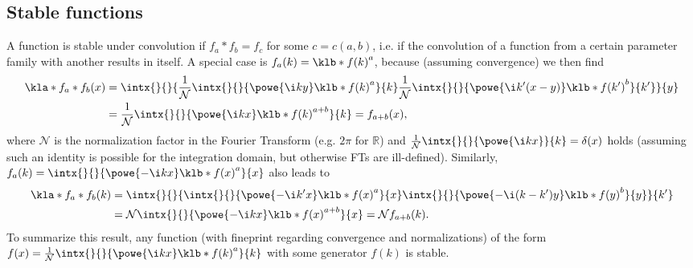 \documentclass[english, parskip=full]{scrartcl}
\begin{document}
\subsection{Stable functions}
A function is stable under convolution if $f_a \ast f_b = f_c$ for some $c=c(a,b)$, i.e. if the convolution of a function from a certain parameter family with another results in itself.
A special case is $f_a(k)=\klb*{f(k)}^a$, because (assuming convergence) we then find
\begin{align}
\kla*{f_a\ast f_b}(x) &= \intx{ }{ }{ \frac{1}{\mathcal{N}}\intx{ }{ }{\powe{\i ky} \klb*{f(k)}^a}{k} \frac{1}{\mathcal{N}}\intx{ }{ }{\powe{\i k'(x-y)} \klb*{f(k')}^b}{k'} }{y}\\
&= \frac{1}{\mathcal{N}} \intx{ }{ }{\powe{\i kx} \klb*{f(k)}^{a+b}}{k} = f_{a+b}(x) ,
\end{align}
where $\mathcal{N}$ is the normalization factor in the Fourier Transform (e.g. $2\pi$ for $\mathbb{R}$) and $\frac{1}{\mathcal{N}} \intx{ }{ }{\powe{\i kx}}{k} = \delta(x)$ holds (assuming such an identity is possible for the integration domain, but otherwise FTs are ill-defined).
Similarly, $f_a(k) = \intx{ }{ }{\powe{-\i kx} \klb*{f(x)}^a}{x}$ also leads to
\begin{align}
\kla*{f_a \ast f_b}(k) &= \intx{ }{ }{ \intx{ }{ }{\powe{-\i k'x} \klb*{f(x)}^a}{x} \intx{ }{ }{\powe{-\i (k-k')y} \klb*{f(y)}^b}{y} }{k'}\\
&= \mathcal{N} \intx{ }{ }{\powe{-\i kx} \klb*{f(x)}^{a+b}}{x} = \mathcal{N} f_{a+b}(k).
\end{align}
To summarize this result, any function (with fineprint regarding convergence and normalizations) of the form $f(x) = \frac{1}{\mathcal{N}} \intx{ }{ }{\powe{\i kx} \klb*{f(k)}^a}{k}$ with some generator $f(k)$ is stable.
\end{document}
